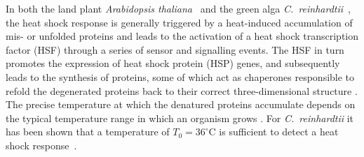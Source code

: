 \documentclass[oneside, 10pt, a4paper, twocolumn]{article}
\begin{document}

In both the land plant \textit{Arabidopsis thaliana}~\cite{Kurepa2003,Sugio2009} and the green alga \textit{C.~reinhardtii}~\cite{Schmollinger2013},
the heat shock response is generally triggered by a heat-induced accumulation of mis- or unfolded proteins
and leads to the activation
of a heat shock transcription factor (HSF)  through a series of sensor and signalling events. The HSF in turn promotes the expression of 
heat shock protein (HSP) genes, and subsequently leads to the synthesis of proteins, some of which act as chaperones responsible to refold the degenerated proteins back to
their correct three-dimensional structure \cite{Craig1993}. 
The precise temperature at which the denatured proteins accumulate depends on the typical temperature range
in which an organism grows \cite{Lindquist1988}. 
For \textit{C.~reinhardtii}
it has been shown that a temperature of $T_0 = 36^\circ\text{C}$ is sufficient to detect a heat shock response~\cite{Kobayashi2014}.
\end{document}
